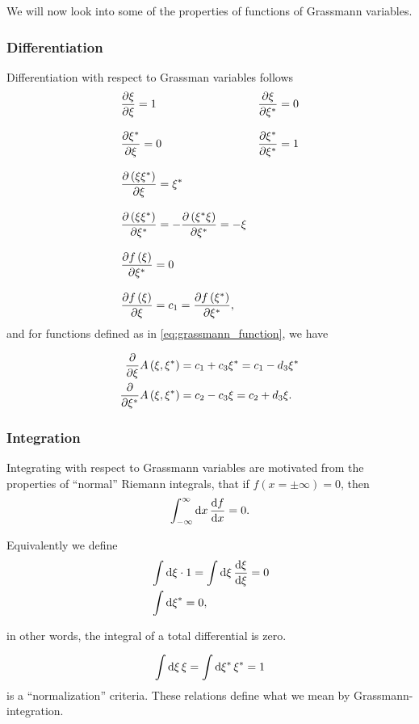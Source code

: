 We will now look into some of the properties of functions of Grassmann variables.
\subsubsection{Differentiation}

Differentiation with respect to Grassman variables follows
\begin{align}
&\frac{\partial \xi}{\partial \xi} = 1 & \frac{\partial \xi}{\partial \xi^*} = 0   \\[2ex]
&\frac{\partial \xi^*}{\partial\xi} = 0 & \frac{\partial \xi^*}{\partial \xi^*} = 1  \\[2ex]
&\pdv{\left(\xi\xi^*\right)}{\xi} = \xi^* &  \\[2ex]
&\pdv{\left(\xi\xi^*\right)}{\xi^*} = -\pdv{\left(\xi^*\xi\right)}{\xi^*} = -\xi  \\[2ex]
&\pdv{f\left(\xi\right)}{\xi^*} = 0 &\\[2ex]
&\pdv{f\left(\xi\right)}{\xi} = c_1 = \pdv{f\left(\xi^*\right)}{\xi^*}, &
\end{align}
and for functions defined as in \eqref{eq:grassmann_function}, we have

\begin{align}
\label{eq:grassmann_derivation}
\pdv{\xi}A\left(\xi, \xi^*\right) &= c_1 + c_3\xi^* = c_1 - d_3\xi^* \\
\pdv{\xi^*}A\left(\xi, \xi^*\right) &= c_2 - c_3\xi = c_2 + d_3\xi.
\end{align}

\subsubsection{Integration}
Integrating with respect to Grassmann variables are motivated from the properties of ``normal'' Riemann integrals, that if $f\left(x = \pm \infty\right) = 0$, then
\begin{equation}
\int_{-\infty}^{\infty}\dd{x} \dv{f}{x} = 0.
\end{equation}

Equivalently we define
\begin{align}
&\int\dd{\xi}\cdot 1 =\int\dd{\xi}\dv{\xi}{\xi} = 0 \\
&\int\dd{\xi}^* = 0,
\end{align}

in other words, the integral of a total differential is zero.

\begin{equation}
\int\dd{\xi}\xi = \int\dd{\xi^*}\xi^* = 1
\end{equation}
is a ``normalization'' criteria. These relations define what we mean by Grassmann-integration.

